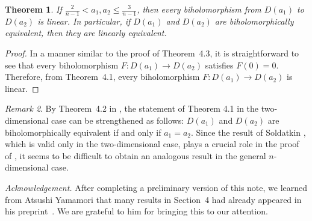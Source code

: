 \documentclass[12pt]{amsart}
\numberwithin{equation}{section}
\newtheorem{theorem}{Theorem}[section]
\theoremstyle{definition}
\theoremstyle{remark}
\newtheorem{remark}[theorem]{Remark}
\newcommand{\1}{{\bf 1}}
\begin{document}
\begin{theorem}
If $\frac{2}{n-1}<a_1, a_2 \leq \frac{3}{n-1}$, 
then every biholomorphism 
from $D(a_1)$ to $D(a_2)$ is linear. 
In particular, if $D(a_1)$ and $D(a_2)$ are
biholomorphically equivalent, then they
are linearly equivalent.
\end{theorem}

\begin{proof}
In a manner similar to the proof of Theorem~4.3, 
it is straightforward to see that  
every biholomorphism $F: D(a_1)\to D(a_2)$ 
satisfies $F(0)=0$. 
Therefore, from Theorem~4.1, 
every biholomorphism 
$F: D(a_1) \to D(a_2)$ is linear. 
\end{proof}


\begin{remark}
By Theorem~4.2 in \cite{Yam25}, 
the statement of Theorem 4.1 in the two-dimensional 
case can be strengthened as follows:
$D(a_1)$ and $D(a_2)$ are biholomorphically 
equivalent if and only if $a_1=a_2$.
Since
the result of Soldatkin \cite{Sol02},  
which is valid only in the two-dimensional case, 
plays a crucial role in the proof of 
\cite{Yam25}, 
it seems to be difficult to obtain
an analogous result 
in the general $n$-dimensional case. 
\end{remark}




\smallskip







{\it Acknowledgement.} \;
After completing a preliminary version of this note, 
we learned from Atsushi Yamamori that many results in Section~4 
had already appeared in his preprint~\cite{Yam25}.
We are grateful to him for bringing this to our attention.
%
\end{document}
